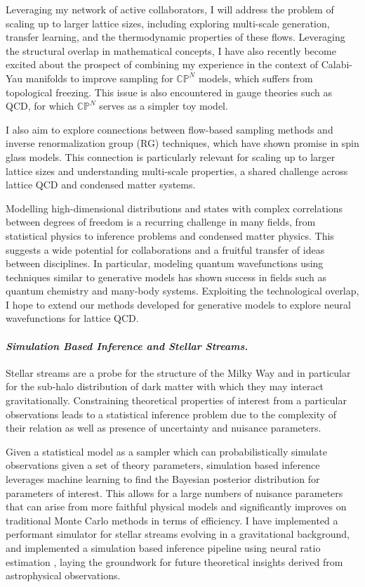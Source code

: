 \documentclass[11pt]{article}
\begin{document}
\textbf{\color{royalblue}{Future Directions.}}
Leveraging my network of active collaborators, I will address the problem of scaling up to larger lattice sizes, including exploring multi-scale generation, transfer learning, and the thermodynamic properties of these flows. Leveraging the structural overlap in mathematical concepts, I have also recently become excited about the prospect of combining my experience in the context of Calabi-Yau manifolds to improve sampling for $\mathbb{CP}^N$ models, which suffers from topological freezing. This issue is also encountered in gauge theories such as QCD, for which $\mathbb{CP}^N$ serves as a simpler toy model.

I also aim to explore connections between flow-based sampling methods and inverse renormalization group (RG) techniques, which have shown promise in spin glass models. This connection is particularly relevant for scaling up to larger lattice sizes and understanding multi-scale properties, a shared challenge across lattice QCD and condensed matter systems.

Modelling high-dimensional distributions and states with complex correlations between degrees of freedom is a recurring challenge in many fields, from statistical physics to inference problems and condensed matter physics.
This suggests a wide potential for collaborations and a fruitful transfer of ideas between disciplines.
In particular, modeling quantum wavefunctions using techniques similar to generative models has shown success in fields such as quantum chemistry and many-body systems. Exploiting the technological overlap, I hope to extend our methods developed for generative models to explore neural wavefunctions for lattice QCD.


\paragraph{\textit{{Simulation Based Inference and Stellar Streams.}}}
Stellar streams are a probe for the structure of the Milky Way and in particular for the sub-halo distribution of dark matter with which they may interact gravitationally. Constraining theoretical properties of interest from a particular observations leads to a statistical inference problem due to the complexity of their relation as well as presence of uncertainty and nuisance parameters.

Given a statistical model as a sampler which can probabilistically simulate observations given a set of theory parameters, simulation based inference leverages machine learning to find the Bayesian posterior distribution for parameters of interest.
This allows for a large numbers of nuisance parameters that can arise from more faithful physical models and significantly improves on traditional Monte Carlo methods in terms of efficiency.
I have implemented a performant simulator for stellar streams evolving in a gravitational background, and implemented a simulation based inference pipeline using neural ratio estimation \cite{alvey2023AlbatrossScalable}, laying the groundwork for future theoretical insights derived from astrophysical observations.
\end{document}
